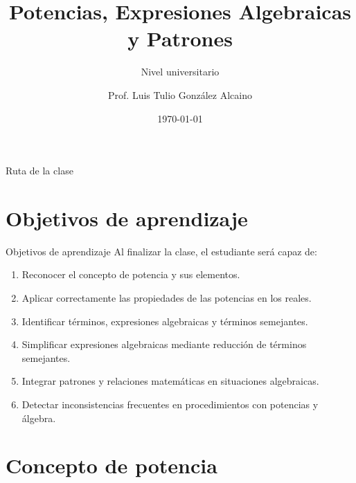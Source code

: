 \documentclass[handout,aspectratio=169]{beamer}
\title[Potencias y Álgebra en los Reales]{Potencias, Expresiones Algebraicas y Patrones}
\subtitle{Nivel universitario}
\author{Prof. Luis Tulio González Alcaino}
\institute{Universidad Santo Tomás \\ Departamento de Ciencias Básicas}
\date{\today}
\begin{document}
	
	\begin{frame}
		\titlepage
	\end{frame}
	
	\begin{frame}{Ruta de la clase}
		\tableofcontents
	\end{frame}
	
	\section{Objetivos de aprendizaje}
	
	\begin{frame}{Objetivos de aprendizaje}
		Al finalizar la clase, el estudiante será capaz de:
		
		\begin{enumerate}
			\item Reconocer el concepto de potencia y sus elementos.
			\item Aplicar correctamente las propiedades de las potencias en los reales.
			\item Identificar términos, expresiones algebraicas y términos semejantes.
			\item Simplificar expresiones algebraicas mediante reducción de términos semejantes.
			\item Integrar patrones y relaciones matemáticas en situaciones algebraicas.
			\item Detectar inconsistencias frecuentes en procedimientos con potencias y álgebra.
		\end{enumerate}
	\end{frame}
	
	\section{Concepto de potencia}
	
\end{document}
